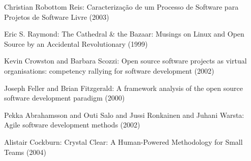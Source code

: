 \documentclass[lnbip]{svmultln}
\begin{document}
\begin{thebibliography}{5}
 Christian Robottom Reis: Caracteriza\c{c}\~{a}o de
  um Processo de Software para Projetos de Software Livre (2003)

 Eric S. Raymond: The Cathedral \& the Bazaar:
  Musings on {Linux} and Open Source by an Accidental Revolutionary
  (1999)

 Kevin Crowston and Barbara Scozzi: Open source
  software projects as virtual organisations: competency rallying for
  software development (2002)

 Joseph Feller and Brian Fitzgerald: A
  framework analysis of the open source software development paradigm
  (2000)

 Pekka Abrahamsson and Outi Salo and Jussi
  Ronkainen and Juhani Warsta: Agile software development methods
  (2002)

 Alistair Cockburn: Crystal Clear: A
  Human-Powered Methodology for Small Teams (2004)











\end{thebibliography}
\end{document}
